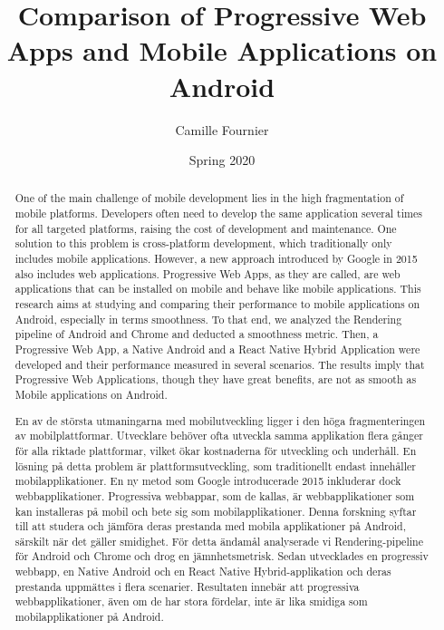 \documentclass{kththesis}
\title{Comparison of Progressive Web Apps and Mobile Applications on Android}
\author{Camille Fournier}
\date{Spring 2020}
\begin{document}
\sloppy %


\frontmatter

\titlepage

\begin{abstract}    
  One of the main challenge of mobile development lies in the high fragmentation of mobile platforms. Developers often need to develop the same application several times for all targeted platforms, raising the cost of development and maintenance. One solution to this problem is cross-platform development, which traditionally only includes mobile applications. However, a new approach introduced by Google in 2015 also includes web applications. Progressive Web Apps, as they are called, are web applications that can be installed on mobile and behave like mobile applications. This research aims at studying and comparing their performance to mobile applications on Android, especially in terms smoothness. To that end, we analyzed the Rendering pipeline of Android and Chrome and deducted a smoothness metric. Then, a Progressive Web App, a Native Android and a React Native Hybrid Application were developed and their performance measured in several scenarios. The results imply that Progressive Web Applications, though they have great benefits, are not as smooth as Mobile applications on Android.
\end{abstract}


\begin{otherlanguage}{swedish}
  \begin{abstract}
    En av de största utmaningarna med mobilutveckling ligger i den höga fragmenteringen av mobilplattformar. Utvecklare behöver ofta utveckla samma applikation flera gånger för alla riktade plattformar, vilket ökar kostnaderna för utveckling och underhåll. En lösning på detta problem är plattformsutveckling, som traditionellt endast innehåller mobilapplikationer. En ny metod som Google introducerade 2015 inkluderar dock webbapplikationer. Progressiva webbappar, som de kallas, är webbapplikationer som kan installeras på mobil och bete sig som mobilapplikationer. Denna forskning syftar till att studera och jämföra deras prestanda med mobila applikationer på Android, särskilt när det gäller smidighet. För detta ändamål analyserade vi Rendering-pipeline för Android och Chrome och drog en jämnhetsmetrisk. Sedan utvecklades en progressiv webbapp, en Native Android och en React Native Hybrid-applikation och deras prestanda uppmättes i flera scenarier. Resultaten innebär att progressiva webbapplikationer, även om de har stora fördelar, inte är lika smidiga som mobilapplikationer på Android.
  \end{abstract}
\end{otherlanguage}
\end{document}
